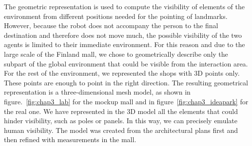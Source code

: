 \documentclass[a4paper,11pt,twoside]{StyleThese}
\begin{document}
The geometric representation is used to compute the visibility of elements of the environment from different positions needed for the pointing of landmarks. However, because the robot does not accompany the person to the final destination and therefore does not move much, the possible visibility of the two agents is limited to their immediate environment. For this reason and due to the large scale of the Finland mall, we chose to geometrically describe only the subpart of the global environment that could be visible from the interaction area. For the rest of the environment, we represented the shops with 3D points only. These points are enough to point in the right direction. The resulting geometrical representation is a three-dimensional mesh model, as shown in figure.~\ref{fig:chap3_lab} for the mockup mall and in figure~\ref{fig:chap3_ideapark} for the real one. We have represented in the 3D model all the elements that could hinder visibility, such as poles or panels. In this way, we can precisely emulate human visibility. The model was created from the architectural plans first and then refined with measurements in the mall.
\end{document}
